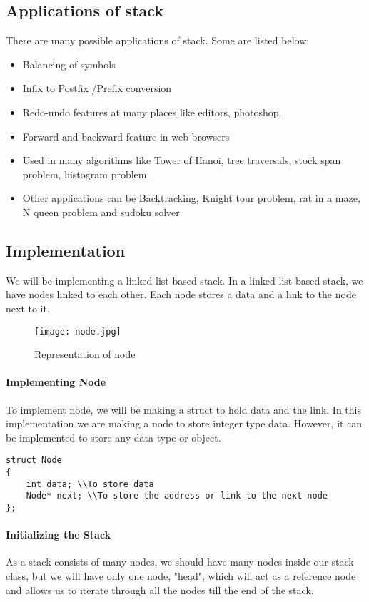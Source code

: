 \documentclass[11pt,fleqn]{book} %
\begin{document}
\subsection{Applications of stack}
There are many possible applications of stack. Some are listed below:
\begin{itemize}
	\item Balancing of symbols
	\item Infix to Postfix /Prefix conversion
	\item Redo-undo features at many places like editors, photoshop.
	\item Forward and backward feature in web browsers
	\item Used in many algorithms like Tower of Hanoi, tree traversals, stock span problem, histogram problem.
	\item Other applications can be Backtracking, Knight tour problem, rat in a maze, N queen problem and sudoku solver
\end{itemize}
\subsection{Implementation}
We will be implementing a linked list based stack. In a linked list based stack, we have nodes linked to each other.
Each node stores a data and a link to the node next to it.
\begin{figure}[H]
	\centering
	\texttt{[image: node.jpg]}
	\caption{Representation of node}
\end{figure}
\paragraph{Implementing Node}
To implement node, we will be making a struct to hold data and the link. In this implementation we are making a node to store integer type data. However, it can be implemented to store any data type or object.
\begin{lstlisting}
struct Node
{
	int data; \\To store data
	Node* next; \\To store the address or link to the next node
};
\end{lstlisting}
\newpage
\paragraph{Initializing the Stack}
As a stack consists of many nodes, we should have many nodes inside our stack class, but we will have only one node, "head", which will act as a reference node and allows us to iterate through all the nodes till the end of the stack.
\end{document}
